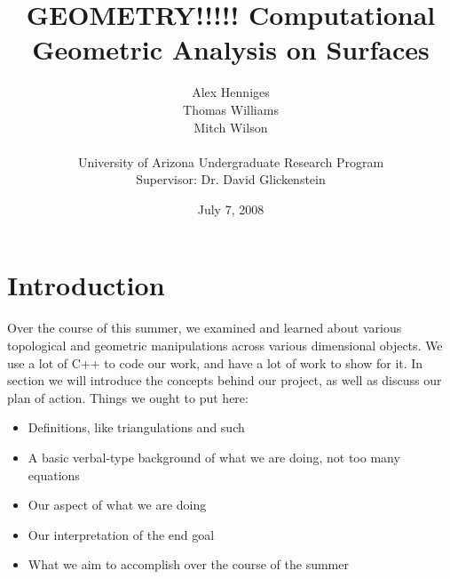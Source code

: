\documentclass[12pt]{article}
\title{GEOMETRY!!!!! Computational Geometric Analysis on Surfaces}
\author{Alex Henniges \\ Thomas Williams \\ Mitch Wilson \\ \\ University of Arizona Undergraduate Research Program\\
Supervisor: Dr. David Glickenstein\\
}
\date{July 7, 2008}
\begin{document}
	\maketitle
  \newpage
  \section{Introduction}
  \maketitle
  Over the course of this summer, we examined and learned about various topological and geometric manipulations across various dimensional objects. We use a lot of C++ to code our work, and have a lot of work to show for it. In section we will introduce the concepts behind our project, as well as discuss our plan of action. 
  Things we ought to put here:
  \begin{itemize}
  \item Definitions, like triangulations and such
  \item A basic verbal-type background of what we are doing, not too many equations
  \item Our aspect of what we are doing
  \item Our interpretation of the end goal
  \item What we aim to accomplish over the course of the summer
  \end{itemize}
  
\end{document}

